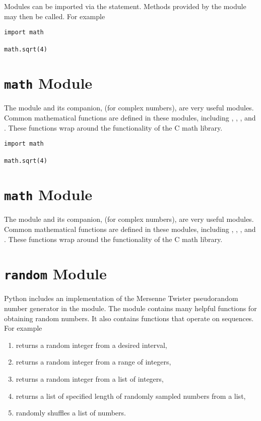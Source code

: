 


Modules can be imported via the  statement. Methods provided by the module may then be called.  For example

\begin{lstlisting}
import math

math.sqrt(4)
\end{lstlisting}

\section*{\texttt{math} Module}
The  module and its companion,  (for complex numbers), are very useful modules.
Common mathematical functions are defined in these modules, including , , , and .
These functions wrap around the functionality of the C math library.

\begin{lstlisting}
import math

math.sqrt(4)
\end{lstlisting}

\section*{\texttt{math} Module}
The  module and its companion,  (for complex numbers), are very useful modules.
Common mathematical functions are defined in these modules, including , , , and .  These functions wrap around the functionality of the C math library.

\section*{\texttt{random} Module}
Python includes an implementation of the Mersenne Twister pseudorandom number generator in the  module.
The  module contains many helpful functions for obtaining random numbers.
It also contains functions that operate on sequences.  For example
\begin{enumerate}
\item {} returns a random integer from a desired interval,
\item {} returns a random integer from a  range of integers,
\item {} returns a random integer from a list of integers,
\item {} returns a list of specified length of randomly sampled numbers from a list,
\item {} randomly shuffles a list of numbers.
\end{enumerate}

